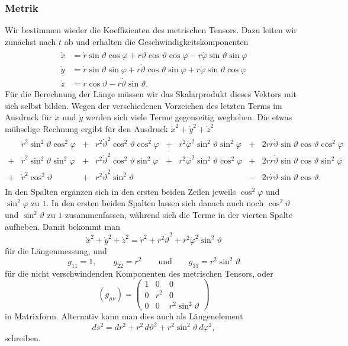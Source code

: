 \subsubsection{Metrik}
Wir bestimmen wieder die Koeffizienten des metrischen Tensors.
Dazu leiten wir zunächst nach $t$ ab und erhalten
die Geschwindigkeitskomponenten
\begin{align*}
\dot x
&=
\dot r\sin\vartheta\cos\varphi
+
r\dot\vartheta \cos\vartheta\cos\varphi
-
r\dot\varphi \sin\vartheta\sin\varphi
\\
\dot y
&=
\dot r\sin\vartheta\sin\varphi
+
r\dot\vartheta\cos\vartheta\sin\varphi
+
r\dot\varphi\sin\vartheta\cos\varphi
\\
\dot z
&=
\dot r\cos\vartheta
-
r\dot\vartheta \sin\vartheta.
\end{align*}
Für die Berechnung der Länge müssen wir das Skalarprodukt dieses
Vektors mit sich selbst bilden.
Wegen der verschiedenen Vorzeichen des letzten Terms im Ausdruck für
$\dot x$ und $\dot y$  werden sich viele Terme gegenseitig wegheben.
Die etwas mühselige Rechnung ergibt für den Ausdruck
$\dot x^2 + \dot y^2 + \dot z^2$ 
\[
\begin{array}{clclclcl}
 &
\dot r^2\sin^2\vartheta\cos^2\varphi
	&+&r^2\dot\vartheta^2\cos^2\vartheta\cos^2\varphi
		&+&r^2\dot\varphi^2\sin^2\vartheta\sin^2\varphi
			&+&2r\dot r\dot\vartheta\sin\vartheta\cos\vartheta\cos^2\varphi
\\
+&
\dot r^2\sin^2\vartheta\sin^2\varphi
	&+&r^2\dot\vartheta^2\cos^2\vartheta\sin^2\varphi
		&+&r^2\dot\varphi^2\sin^2\vartheta\cos^2\varphi
			&+&2r\dot r\dot\vartheta\sin\vartheta\cos\vartheta\sin^2\varphi
\\
+&
\dot r^2\cos^2\vartheta
	&+&r^2\dot\vartheta^2\sin^2\vartheta
		& &
			&-&2r\dot r\dot\vartheta \sin\vartheta \cos\vartheta.
\\
\end{array}
\]
In den Spalten ergänzen sich in den ersten beiden Zeilen jeweils
$\cos^2\varphi$ und $\sin^2\varphi$ zu $1$.
In den ersten beiden Spalten lassen sich danach auch noch
$\cos^2\vartheta$ und $\sin^2\vartheta$ zu $1$ zusammenfassen,
während sich die Terme in der vierten Spalte aufheben.
Damit bekommt man
\begin{equation}
\dot x^2 + \dot y^2 + \dot z^2
=
\dot r^2+r^2\dot\vartheta^2 + r^2\dot\varphi^2\sin^2\vartheta
\label{skript:kruemmung:kugelkoordinaten}
\end{equation}
für die Längenmessung, und
\[
g_{11}=1,\qquad
g_{22}=r^2
\qquad\text{und}\qquad
g_{33}= r^2\sin^2\vartheta
\]
für die nicht verschwindenden Komponenten des metrischen Tensors,
oder
\[
(g_{\mu\nu})
=
\begin{pmatrix}
1&  0&       0          \\
0&r^2&       0          \\
0&  0&r^2\sin^2\vartheta
\end{pmatrix}
\]
in Matrixform.
Alternativ kann man dies auch als Längenelement
\begin{equation}
ds^2
=
dr^2 + r^2\,d\vartheta^2 + r^2\sin^2\vartheta\,d\varphi^2,
\label{skript:laengenmessung:kugelkoordinaten}
\end{equation}
schreiben.
%

